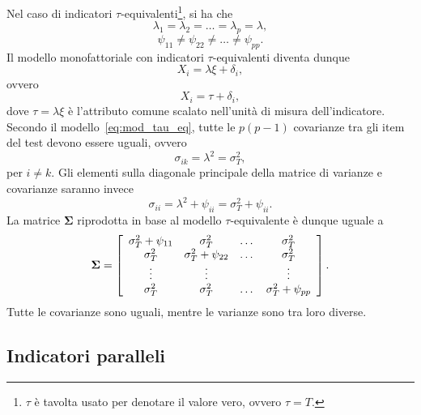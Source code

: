 Nel caso di indicatori $\tau$-equivalenti\footnote{$\tau$ è tavolta
  usato per denotare il valore vero, ovvero $\tau = T$.}, si ha
  che $$\lambda_1=\lambda_2=\dots=\lambda_p=\lambda,$$
$$\psi_{11}\neq \psi_{22} \neq \dots\neq \psi_{pp}.$$
 Il modello monofattoriale con indicatori $\tau$-equivalenti diventa dunque 
\begin{equation}
X_i = \lambda \xi + \delta_i, 
\label{eq:mod_tau_eq}
\end{equation}
ovvero
\begin{equation}
X_i = \tau + \delta_i,
\label{eq:mod_tau_eq_b}
\end{equation}
dove $\tau=\lambda \xi$ è l'attributo comune scalato nell'unità di
misura dell'indicatore.
Secondo il modello~\ref{eq:mod_tau_eq}, tutte le $p(p-1)$  covarianze tra gli
item del test devono essere uguali, ovvero
\begin{equation}
\sigma_{ik} = \lambda^2=\sigma^2_T,
\label{eq:cov_tau_eq}
\end{equation}
per $i\neq k$. 
 Gli elementi sulla diagonale principale della matrice di varianze e covarianze saranno invece 
\begin{equation}
\sigma_{ii} = \lambda^2 + \psi_{ii} =\sigma^2_T + \psi_{ii}.
\label{eq:var_tau}
\end{equation}
La matrice  $\boldsymbol{\Sigma}$ riprodotta in base al modello $\tau$-equivalente  è dunque uguale a
  \begin{equation}
    \boldsymbol{\Sigma}=\left[
      \begin{array}{ c c c c }
        \sigma_{T}^2 + \psi_{11} & \sigma_{T}^2 & \dots & \sigma_{T}^2 \\
        \sigma_{T}^2 & \sigma_{T}^2 + \psi_{22} & \dots & \sigma_{T}^2 \\
        \vdots & \vdots & & \vdots\\
        \sigma_{T}^2 & \sigma_{T}^2 & \dots & \sigma_{T}^2 + \psi_{pp} 
      \end{array} 
    \right].
    \label{eq:sigma_tau_eq}
  \end{equation}
  Tutte le covarianze sono uguali, mentre  le varianze sono  tra loro diverse.


\subsection{Indicatori paralleli}

